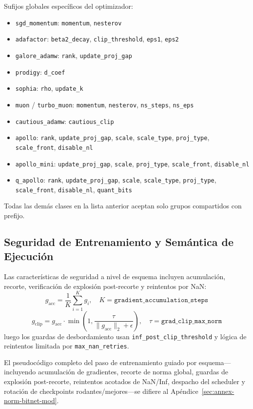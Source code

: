 Sufijos globales específicos del optimizador:
\begin{itemize}[leftmargin=*]
    \item \texttt{sgd\_momentum}: \texttt{momentum}, \texttt{nesterov}
    \item \texttt{adafactor}: \texttt{beta2\_decay}, \texttt{clip\_threshold}, \texttt{eps1}, \texttt{eps2}
    \item \texttt{galore\_adamw}: \texttt{rank}, \texttt{update\_proj\_gap}
    \item \texttt{prodigy}: \texttt{d\_coef}
    \item \texttt{sophia}: \texttt{rho}, \texttt{update\_k}
    \item \texttt{muon} / \texttt{turbo\_muon}: \texttt{momentum}, \texttt{nesterov}, \texttt{ns\_steps}, \texttt{ns\_eps}
    \item \texttt{cautious\_adamw}: \texttt{cautious\_clip}
    \item \texttt{apollo}: \texttt{rank}, \texttt{update\_proj\_gap}, \texttt{scale}, \texttt{scale\_type}, \texttt{proj\_type}, \texttt{scale\_front}, \texttt{disable\_nl}
    \item \texttt{apollo\_mini}: \texttt{update\_proj\_gap}, \texttt{scale}, \texttt{proj\_type}, \texttt{scale\_front}, \texttt{disable\_nl}
    \item \texttt{q\_apollo}: \texttt{rank}, \texttt{update\_proj\_gap}, \texttt{scale}, \texttt{scale\_type}, \texttt{proj\_type}, \texttt{scale\_front}, \texttt{disable\_nl}, \texttt{quant\_bits}
\end{itemize}
Todas las demás clases en la lista anterior aceptan solo grupos compartidos con prefijo.

\subsection{Seguridad de Entrenamiento y Semántica de Ejecución}

Las características de seguridad a nivel de esquema incluyen acumulación, recorte, verificación de explosión post-recorte y reintentos por NaN:
\[
g_{\text{acc}}=\frac{1}{K}\sum_{i=1}^{K} g_i,\quad K=\texttt{gradient\_accumulation\_steps}
\]
\[
g_{\text{clip}} = g_{\text{acc}}\cdot
\min\left(1,\frac{\tau}{\|g_{\text{acc}}\|_2+\epsilon}\right),\quad
\tau=\texttt{grad\_clip\_max\_norm}
\]
luego los guardas de desbordamiento usan \texttt{inf\_post\_clip\_threshold} y lógica de reintentos limitada por \texttt{max\_nan\_retries}.

El pseudocódigo completo del paso de entrenamiento guiado por esquema---incluyendo acumulación de gradientes, recorte de norma global, guardas de explosión post-recorte, reintentos acotados de NaN/Inf, despacho del scheduler y rotación de checkpoints rodantes/mejores---se difiere al Apéndice~\ref{sec:annex-norm-bitnet-mod}.

